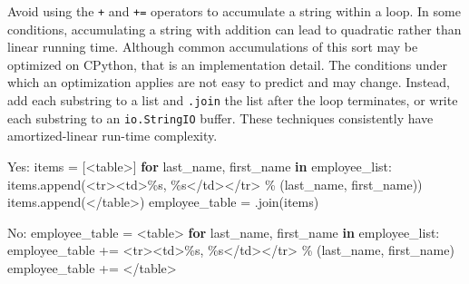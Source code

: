\documentclass[
]{article}
\newenvironment{Shaded}{}{}
\newcommand{\ControlFlowTok}[1]{\textcolor[rgb]{0.00,0.44,0.13}{\textbf{#1}}}
\newcommand{\KeywordTok}[1]{\textcolor[rgb]{0.00,0.44,0.13}{\textbf{#1}}}
\newcommand{\NormalTok}[1]{#1}
\newcommand{\OperatorTok}[1]{\textcolor[rgb]{0.40,0.40,0.40}{#1}}
\newcommand{\SpecialCharTok}[1]{\textcolor[rgb]{0.25,0.44,0.63}{#1}}
\newcommand{\StringTok}[1]{\textcolor[rgb]{0.25,0.44,0.63}{#1}}
\begin{document}
Avoid using the \texttt{+} and \texttt{+=} operators to accumulate a
string within a loop. In some conditions, accumulating a string with
addition can lead to quadratic rather than linear running time. Although
common accumulations of this sort may be optimized on CPython, that is
an implementation detail. The conditions under which an optimization
applies are not easy to predict and may change. Instead, add each
substring to a list and
\texttt{\textquotesingle{}\textquotesingle{}.join} the list after the
loop terminates, or write each substring to an \texttt{io.StringIO}
buffer. These techniques consistently have amortized-linear run-time
complexity.

\begin{samepage}
\begin{Shaded}
\begin{Highlighting}[]
\NormalTok{Yes: items }\OperatorTok{=}\NormalTok{ [}\StringTok{\textquotesingle{}\textless{}table\textgreater{}\textquotesingle{}}\NormalTok{]}
     \ControlFlowTok{for}\NormalTok{ last\_name, first\_name }\KeywordTok{in}\NormalTok{ employee\_list:}
\NormalTok{         items.append(}\StringTok{\textquotesingle{}\textless{}tr\textgreater{}\textless{}td\textgreater{}}\SpecialCharTok{\%s}\StringTok{, }\SpecialCharTok{\%s}\StringTok{\textless{}/td\textgreater{}\textless{}/tr\textgreater{}\textquotesingle{}} \OperatorTok{\%}\NormalTok{ (last\_name, first\_name))}
\NormalTok{     items.append(}\StringTok{\textquotesingle{}\textless{}/table\textgreater{}\textquotesingle{}}\NormalTok{)}
\NormalTok{     employee\_table }\OperatorTok{=} \StringTok{\textquotesingle{}\textquotesingle{}}\NormalTok{.join(items)}
\end{Highlighting}
\end{Shaded}
\end{samepage}

\begin{samepage}
\begin{Shaded}
\begin{Highlighting}[]
\NormalTok{No: employee\_table }\OperatorTok{=} \StringTok{\textquotesingle{}\textless{}table\textgreater{}\textquotesingle{}}
    \ControlFlowTok{for}\NormalTok{ last\_name, first\_name }\KeywordTok{in}\NormalTok{ employee\_list:}
\NormalTok{        employee\_table }\OperatorTok{+=} \StringTok{\textquotesingle{}\textless{}tr\textgreater{}\textless{}td\textgreater{}}\SpecialCharTok{\%s}\StringTok{, }\SpecialCharTok{\%s}\StringTok{\textless{}/td\textgreater{}\textless{}/tr\textgreater{}\textquotesingle{}} \OperatorTok{\%}\NormalTok{ (last\_name, first\_name)}
\NormalTok{    employee\_table }\OperatorTok{+=} \StringTok{\textquotesingle{}\textless{}/table\textgreater{}\textquotesingle{}}
\end{Highlighting}
\end{Shaded}
\end{samepage}
\end{document}
